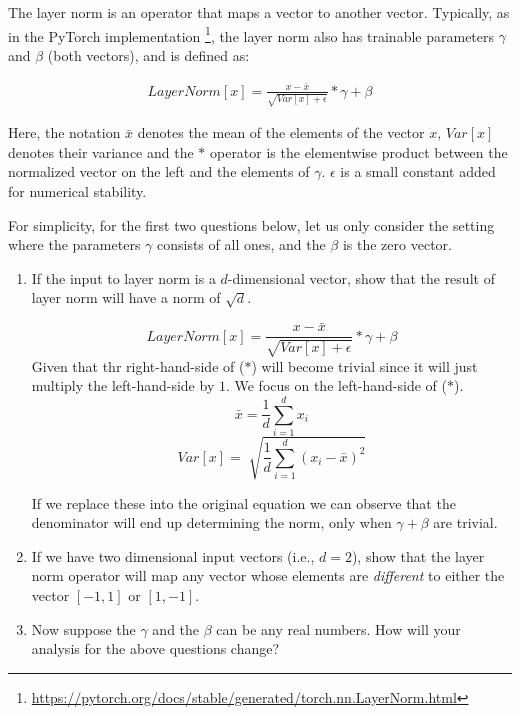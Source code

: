 The layer norm is an operator that maps a vector to another vector. Typically, as in the PyTorch implementation \footnote{\url{https://pytorch.org/docs/stable/generated/torch.nn.LayerNorm.html}}, the layer norm also has trainable parameters $\gamma$ and $\beta$ (both vectors), and is defined as:

\begin{align*}
LayerNorm[x] = \frac{x - \bar{x}}{\sqrt{Var[x] + \epsilon}} * \gamma + \beta
\end{align*}

Here, the notation $\bar{x}$ denotes the mean of the elements of the vector $x$,  $Var[x]$ denotes their variance and the $*$ operator is the elementwise product between the normalized vector on the left and the elements of $\gamma$. $\epsilon$ is a small constant added for numerical stability.

For simplicity, for the first two questions below, let us only consider the setting where the parameters $\gamma$ consists of all ones, and the $\beta$ is the zero vector.

\begin{enumerate}
\item\relax[5 points] If the input to layer norm is a $d$-dimensional vector, show that the result of layer norm will have a norm of $\sqrt{d}$.
\begin{flushleft}
    \[LayerNorm[x] = \frac{x - \bar{x}}{\sqrt{Var[x] + \epsilon}} * \gamma + \beta\]
    Given that thr right-hand-side of ($*$) will become trivial since it will just multiply
    the left-hand-side by $1$. We focus on the left-hand-side of ($*$).
    \[\bar{x} = \frac{1}{d}\sum_{i=1}^{d}x_i\]
    \[Var[x] = \sqrt[]{\frac{1}{d}\sum_{i=1}^{d}(x_i - \bar{x})^2}\]

    If we replace these into the original equation we can observe that the denominator will
    end up determining the norm, only when $\gamma + \beta$ are trivial.
\end{flushleft}
\item\relax[10 points]  If we have two dimensional input vectors (i.e., $d=2$), show that the layer norm operator will map any vector whose elements are \emph{different} to either the vector $[-1, 1]$ or $[1, -1]$.

\item\relax[5 points] Now suppose the $\gamma$ and the $\beta$ can be any real numbers. How will your analysis for the above questions change? 
\end{enumerate}
